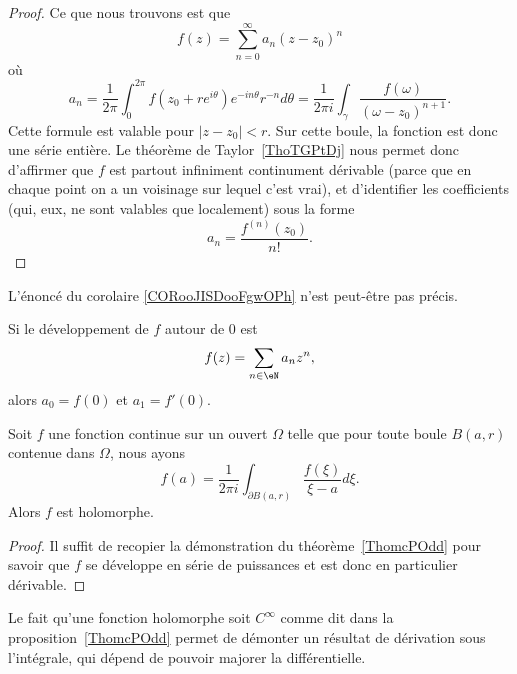 \begin{proof}
	Ce que nous trouvons est que
	\begin{equation}
		f(z)=\sum_{n=0}^{\infty}a_n(z-z_0)^n
	\end{equation}
	où
	\begin{equation}
		a_n=\frac{1}{ 2\pi }\int_0^{2\pi}f(z_0+r e^{i\theta}) e^{-in\theta}r^{-n}d\theta=\frac{1}{ 2\pi i }\int_{\gamma}\frac{ f(\omega) }{ (\omega-z_0)^{n+1} }.
	\end{equation}
	Cette formule est valable pour \( | z-z_0 |<r\). Sur cette boule, la fonction est donc une série entière. Le théorème de Taylor~\ref{ThoTGPtDj} nous permet donc d'affirmer que \( f\) est partout infiniment continument dérivable (parce que en chaque point on a un voisinage sur lequel c'est vrai), et d'identifier les coefficients (qui, eux, ne sont valables que localement) sous la forme
	\begin{equation}
		a_n=\frac{ f^{(n)}(z_0) }{ n! }.
	\end{equation}
\end{proof}


\begin{probleme}
	L'énoncé du corolaire \ref{CORooJISDooFgwOPh} n'est peut-être pas précis.
\end{probleme}

\begin{corollary}       \label{CORooJISDooFgwOPh}
	Si le développement de \( f\) autour de \( 0\) est
	\begin{equation}
		f(z)=\sum_{n\in \eN}a_nz^n,
	\end{equation}
	alors \( a_0=f(0)\) et \( a_1=f'(0)\).
\end{corollary}

\begin{corollary}       \label{CorwfHtJu}
	Soit \( f\) une fonction continue sur un ouvert \( \Omega\) telle que pour toute boule \( B(a,r)\) contenue dans \( \Omega\), nous ayons
	\begin{equation}
		f(a)=\frac{1}{ 2\pi i }\int_{\partial B(a,r)}\frac{ f(\xi) }{ \xi-a }d\xi.
	\end{equation}
	Alors \( f\) est holomorphe.
\end{corollary}

\begin{proof}
	Il suffit de recopier la démonstration du théorème~\ref{ThomcPOdd} pour savoir que \( f\) se développe en série de puissances et est donc en particulier dérivable.
\end{proof}

Le fait qu'une fonction holomorphe soit \(  C^{\infty}\) comme dit dans la proposition~\ref{ThomcPOdd} permet de démonter un résultat de dérivation sous l'intégrale, qui dépend de pouvoir majorer la différentielle.

